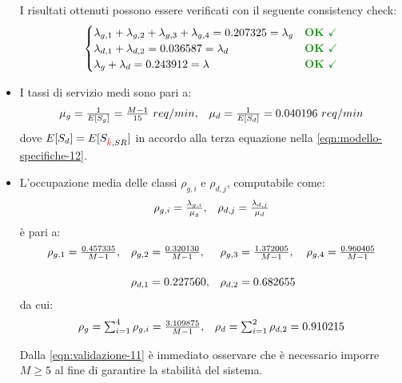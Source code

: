 \begin{itemize}
I risultati ottenuti possono essere verificati con il seguente consistency check:
\begin{equation}
\begin{cases}
\lambda_{g,1} + \lambda_{g,2} + \lambda_{g,3} + \lambda_{g,4} = 0.207325 = \lambda_g & \text{\color{forestgreen}\textbf{OK} \checkmark} \\
\lambda_{d,1} + \lambda_{d,2} = 0.036587 = \lambda_d & \text{\color{forestgreen}\textbf{OK} \checkmark} \\
\lambda_g + \lambda_d = 0.243912 = \lambda & \text{\color{forestgreen}\textbf{OK} \checkmark}
\end{cases}
\end{equation}

\item I tassi di servizio medi sono pari a:
\begin{equation}
\begin{array}{l l}
\mu_g = \frac{1}{E[S_g]} = \frac{M-1}{15}\ req/min, & \mu_d = \frac{1}{E[S_d]} = 0.040196\ req/min
\end{array}
\end{equation}
dove $E[S_d] = E[S_{{\color{red}\hat{k}}{}, SR}]$ in accordo alla terza equazione nella \ref{eqn:modello-specifiche-12}.

\item L'occupazione media delle classi $\rho_{g,i}$ e $\rho_{d,j}$, computabile come:
\begin{equation}
\begin{array}{l l}
\rho_{g,i} = \frac{\lambda_{g,i}}{\mu_g}, & \rho_{d,j} = \frac{\lambda_{d,j}}{\mu_d}
\end{array}
\end{equation}
è pari a:
\begin{equation}
\begin{array}{l l l l}
\rho_{g,1} = \frac{0.457335}{M-1}, & \rho_{g,2} = \frac{0.320130}{M-1}, & \rho_{g,3} = \frac{1.372005}{M-1}, & \rho_{g,4} = \frac{0.960405}{M-1} \\[1.5em]
& \rho_{d,1} = 0.227560, & \rho_{d,2} = 0.682655 &
\end{array}
\end{equation}
da cui:
\begin{equation}
\label{eqn:validazione-11}
\begin{array}{l l}
\rho_g = \sum_{i=1}^4 \rho_{g,i} = \frac{3.109875}{M-1}, & \rho_d = \sum_{i=1}^2 \rho_{d,2} = 0.910215
\end{array}
\end{equation}


Dalla \ref{eqn:validazione-11} è immediato osservare che è necessario imporre $M \geq 5$ al fine di garantire la stabilità del sistema.
\end{itemize}

